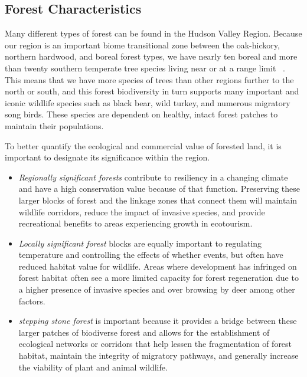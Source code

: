 \subsection*{Forest Characteristics}\label{subsec:forestcharacteristics}
Many different types of forest can be found in the Hudson Valley Region.
Because our region is an important biome transitional zone between the
oak-hickory, northern hardwood, and boreal forest types, we have nearly ten
boreal and more than twenty southern temperate tree species living near or at a
range limit ~\citep{ldeo}. This means that we have more species of trees than other regions
further to the north or south, and this forest biodiversity in turn supports
many important and iconic wildlife species such as black bear, wild turkey, and
numerous migratory song birds. These species are dependent on healthy, intact
forest patches to maintain their populations.
\par
To better quantify the ecological and commercial value of forested land, it is
important to designate its significance within the region.
\begin{itemize}
    \item \textit{Regionally significant forests} contribute to resiliency in a
        changing climate and have a high conservation value because of that
        function. Preserving these larger blocks of forest and the linkage zones that
        connect them will maintain wildlife corridors, reduce the impact of invasive
        species, and provide recreational benefits to areas experiencing growth in
        eco\-tourism. 
    \item \textit{Locally significant forest} blocks are equally important to regulating temperature and controlling the effects of whether
        events, but often have reduced habitat value for wildlife. Areas where
        development has infringed on forest habitat often see a more limited
        capacity for forest regeneration due to a higher presence of invasive
        species and over browsing by deer among other factors.  
    \item \textit{stepping stone forest} is important because it provides a
        bridge between these larger patches of biodiverse forest and allows
        for the establishment of ecological networks or corridors that help
        lessen the fragmentation of forest habitat, maintain the integrity
        of migratory pathways, and generally increase the viability of
        plant and animal wildlife.
\end{itemize}

